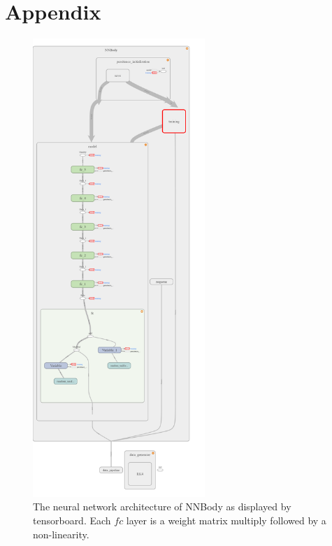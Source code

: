 \documentclass{article}
\numberwithin{theorem}{section}
\numberwithin{equation}{section}
\begin{document}
% 
% 
% 


\newpage
\section{Appendix}

\begin{figure}[H]
\begin{center}
	\caption{The neural network architecture of NNBody as displayed by tensorboard. Each $fc$ layer is a weight matrix multiply followed by a non-linearity.}
	\includegraphics[width=0.58\textwidth]{lol.png}
\end{center}

\end{figure}
\end{document}
